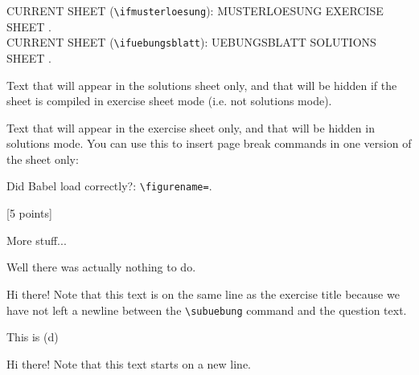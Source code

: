 \documentclass[11pt,a4paper]{article}
\begin{document}
CURRENT SHEET (\texttt{\textbackslash ifmusterloesung}):
\ifmusterloesung MUSTERLOESUNG \else EXERCISE SHEET \fi .\\
CURRENT SHEET (\texttt{\textbackslash ifuebungsblatt}):
\ifuebungsblatt UEBUNGSBLATT \else SOLUTIONS SHEET \fi .

\begin{onlysolutions} %
Text that will appear in the solutions sheet only, and that will be hidden if the sheet is
compiled in exercise sheet mode (i.e. not solutions mode).
\end{onlysolutions}
\begin{onlyuebungsblatt} %
Text that will appear in the exercise sheet only, and that will be hidden in solutions
mode. You can use this to insert page break commands in one version of the sheet only:

\newpage
\end{onlyuebungsblatt}

Did Babel load correctly?: \texttt{\textbackslash figurename=}\figurename.



[5 points]

More stuff...

\begin{solution}
  Well there was actually nothing to do.
\end{solution}


Hi there! Note that this text is on the same line as the exercise title because we have
not left a newline between the \texttt{\textbackslash subuebung} command and the question
text.

\begin{exenumerate}\setcounter{exenumeratei}{3}
\item This is (d)
\end{exenumerate}


Hi there! Note that this text starts on a new line.


\end{document}
